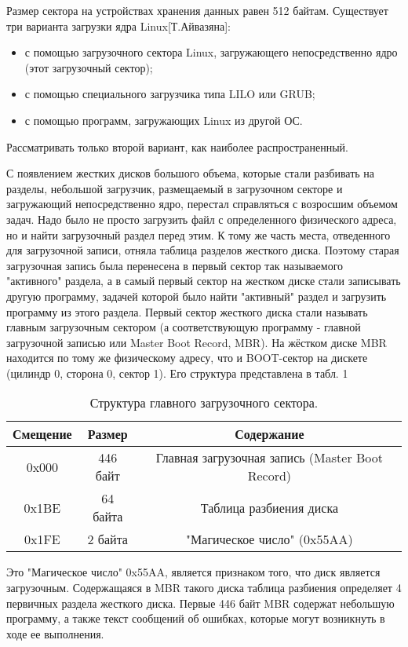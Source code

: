 Размер сектора на устройствах хранения данных равен 512 байтам. Существует три варианта загрузки ядра Linux[Т.Айвазяна]:
\begin{itemize}
\item с помощью загрузочного сектора Linux, загружающего непосредственно ядро (этот загрузочный сектор);
\item с помощью специального загрузчика типа LILO или GRUB;
\item с помощью программ, загружающих Linux из другой ОС.
\end{itemize}
Рассматривать только второй вариант, как наиболее распространенный.

С появлением жестких дисков большого объема, которые стали разбивать на разделы, небольшой загрузчик, размещаемый в загрузочном секторе и загружающий непосредственно ядро, перестал справляться с возросшим объемом задач. Надо было не просто загрузить файл с определенного физического адреса, но и найти загрузочный раздел перед этим. К тому же часть места, отведенного для загрузочной записи, отняла таблица разделов жесткого диска. Поэтому старая загрузочная запись была перенесена в первый сектор так называемого "активного" раздела, а в самый первый сектор на жестком диске стали записывать другую программу, задачей которой было найти "активный" раздел и загрузить программу из этого раздела. Первый сектор жесткого диска стали называть главным загрузочным сектором (а соответствующую программу - главной загрузочной записью или Master Boot Record, MBR). На жёстком диске MBR находится по тому же физическому адресу, что и BOOT-сектор на дискете (цилиндр 0, сторона 0, сектор 1). Его структура представлена в табл. 1

\begin{table}
\centering
\begin{tabular}{|c|c|c|}
\hline 
Смещение & Размер & Содержание \\ 
\hline 
0x000 & 446 байт & {Главная загрузочная запись (Master Boot Record)} \\ 
\hline 
0x1BE & 64 байта & Таблица разбиения диска \\ 
\hline 
0x1FE & 2 байта & "Магическое число" (0x55AA) \\ 
\hline 
\end{tabular}
\caption{Структура главного загрузочного сектора.}
\label{tab:xyz}
\end{table}

Это "Магическое число" 0x55AA, является признаком того, что диск является загрузочным. Содержащаяся в MBR такого диска таблица разбиения определяет 4 первичных раздела жесткого диска. Первые 446 байт MBR содержат небольшую программу, а также текст сообщений об ошибках, которые могут возникнуть в ходе ее выполнения.


